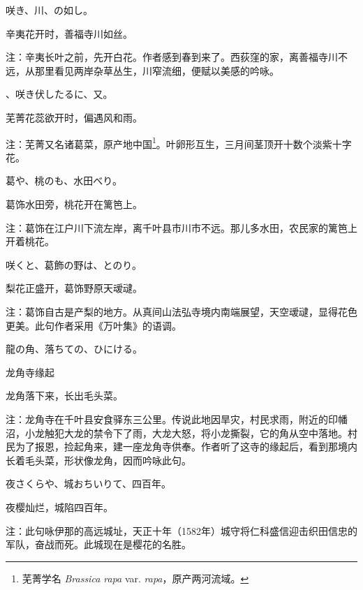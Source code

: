 \begin{haiku}
    {\FH {}咲き、川、の如し。}

    {\FK 辛夷花开时，善福寺川如丝。}

    {\FT 注：辛夷长叶之前，先开白花。作者感到春到来了。西荻窪的家，离善福寺川不远，从那里看见两岸杂草丛生，川窄流细，便赋以美感的吟咏。}
\end{haiku}

\begin{haiku}
    {\FH {}、咲き伏したるに、又。}

    {\FK 芜菁花蕊欲开时，偏遇风和雨。}

    {\FT 注：芜菁又名诸葛菜，原产地中国\footnote{{\FT 芜菁学名} \emph{Brassica rapa} var. \emph{rapa}{\FT ，原产两河流域。}}。叶卵形互生，三月间茎顶开十数个淡紫十字花。}
\end{haiku}

\begin{haiku}
    {\FH 葛や、桃のも、水田べり。}

    {\FK 葛饰水田旁，桃花开在篱笆上。}

    {\FT 注：葛饰在江户川下流左岸，离千叶县市川市不远。那儿多水田，农民家的篱笆上开着桃花。}
\end{haiku}

\begin{haiku}
    {\FH {}咲くと、葛飾の野は、とのり。}

    {\FK 梨花正盛开，葛饰野原天叆叇。}

    {\FT 注：葛饰自古是产梨的地方。从真间山法弘寺境内南端展望，天空叆叇，显得花色更美。此句作者采用《万叶集》的语调。}
\end{haiku}

\begin{haiku}
    {\FH 龍の角、落ちての、ひにける。}

    {\FK 龙角寺缘起}

    {\FK 龙角落下来，长出毛头菜。}

    {\FT 注：龙角寺在千叶县安食驿东三公里。传说此地因旱灾，村民求雨，附近的印幡沼，小龙触犯大龙的禁令下了雨，大龙大怒，将小龙撕裂，它的角从空中落地。村民为了报恩，捡起角来，建一座龙角寺供奉。作者听了这寺的缘起后，看到那境内长着毛头菜，形状像龙角，因而吟咏此句。}
\end{haiku}

\begin{haiku}
    {\FH 夜さくらや、城おちいりて、四百年。}

    {\FK 夜樱灿烂，城陷四百年。}

    {\FT 注：此句咏伊那的高远城址，天正十年（1582年）城守将仁科盛信迎击织田信忠的军队，奋战而死。此城现在是樱花的名胜。}
\end{haiku}

